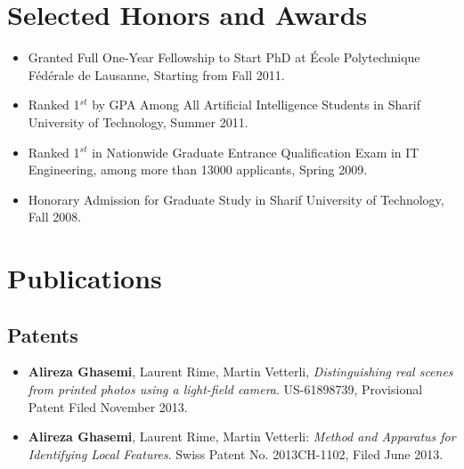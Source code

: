 \documentclass[a4paper]{article}
\theoremstyle{definition}
\begin{document}
\section{Selected Honors and Awards}
\begin{itemize}
\item Granted Full One-Year Fellowship to Start PhD at  \'{E}cole Polytechnique F\'{e}d\'{e}rale de Lausanne, Starting from Fall 2011.
\item Ranked 1$^{st}$ by GPA Among All Artificial Intelligence Students in Sharif University of Technology, Summer 2011.
\item Ranked 1$^{st}$ in Nationwide Graduate Entrance Qualification Exam in IT Engineering, among more than 13000 applicants, Spring 2009.
\item Honorary Admission for Graduate Study in Sharif University of Technology, Fall 2008.
\end{itemize}
\section{Publications}
\subsection{Patents}
\begin{itemize}

\item \textbf{Alireza Ghasemi}, Laurent Rime, Martin Vetterli, \textit{Distinguishing real scenes from printed photos using a light-field camera}. US-61898739, Provisional Patent Filed November 2013.
\item \textbf{Alireza Ghasemi}, Laurent Rime, Martin Vetterli:\textit{ Method and Apparatus for Identifying Local Features}. Swiss Patent No. 2013CH-1102, Filed June 2013. 
\end{itemize}
\end{document}
